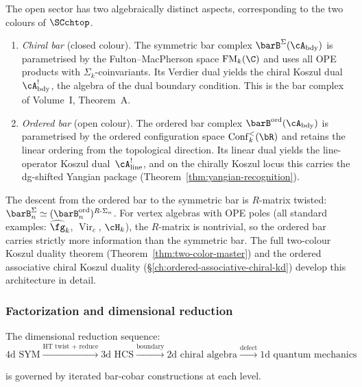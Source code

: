 \begin{remark}
\label{rem:open-sector-two-colour}
The open sector has two algebraically distinct aspects,
corresponding to the two colours of $\SCchtop$.
\begin{enumerate}[label=(\roman*)]
\item \emph{Chiral bar} (closed colour). The symmetric bar complex
 $\barB^{\Sigma}(\cA_{\mathrm{bdy}})$ is parametrised by the
 Fulton--MacPherson space $\FM_k(\C)$ and uses all OPE products with
 $\Sigma_k$-coinvariants. Its Verdier dual yields the chiral Koszul
 dual~$\cA^!_{\mathrm{bdy}}$, the algebra of the dual boundary
 condition. This is the bar complex of Volume~I, Theorem~A.
\item \emph{Ordered bar} (open colour). The ordered bar complex
 $\barB^{\mathrm{ord}}(\cA_{\mathrm{bdy}})$ is parametrised by the
 ordered configuration space $\Conf_k^<(\bR)$ and retains the linear
 ordering from the topological direction. Its linear dual yields the
 line-operator Koszul dual~$\cA^!_{\mathrm{line}}$, and on the chirally
 Koszul locus this carries the dg-shifted Yangian package
 (Theorem~\ref{thm:yangian-recognition}).
\end{enumerate}
The descent from the ordered bar to the symmetric bar is
$R$-matrix twisted: $\barB^{\Sigma}_n \simeq
(\barB^{\mathrm{ord}}_n)^{R\text{-}\Sigma_n}$. For vertex
algebras with OPE poles (all standard examples: $\widehat{\fg}_k$,
$\operatorname{Vir}_c$, $\cH_k$), the $R$-matrix is nontrivial,
so the ordered bar carries strictly more information than the
symmetric bar. The full two-colour Koszul duality theorem
(Theorem~\ref{thm:two-color-master}) and the ordered
associative chiral Koszul duality
(\S\ref{ch:ordered-associative-chiral-kd}) develop this architecture in
detail.
\end{remark}

\subsubsection{Factorization and dimensional reduction}

\begin{remark}\label{rem:factorization-dim-tower}
The dimensional reduction sequence:
\[\text{4d SYM} \xrightarrow{\text{HT twist + reduce}}
\text{3d HCS} \xrightarrow{\text{boundary}}
\text{2d chiral algebra} \xrightarrow{\text{defect}}
\text{1d quantum mechanics}\]

is governed by iterated bar-cobar constructions at each level.
\end{remark}

